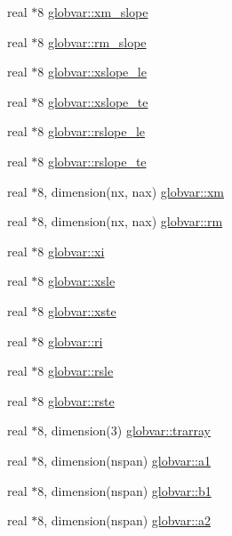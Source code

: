 \begin{DoxyCompactItemize}
\item 
real $\ast$8 \hyperlink{namespaceglobvar_acec26aa18c34a950efbf95fbe83fb5e3}{globvar\+::xm\+\_\+slope}
\item 
real $\ast$8 \hyperlink{namespaceglobvar_a7c5baea908b3455982aa5e0919c52887}{globvar\+::rm\+\_\+slope}
\item 
real $\ast$8 \hyperlink{namespaceglobvar_a6e2e677a1248884a0beaf14ef03a7d1e}{globvar\+::xslope\+\_\+le}
\item 
real $\ast$8 \hyperlink{namespaceglobvar_a1a3ff3ff118aab96696dca2da144a415}{globvar\+::xslope\+\_\+te}
\item 
real $\ast$8 \hyperlink{namespaceglobvar_a3f456fc3a0cf242d08ec86f9105644be}{globvar\+::rslope\+\_\+le}
\item 
real $\ast$8 \hyperlink{namespaceglobvar_a0669c0da9b37b2db9ee462980dc9df12}{globvar\+::rslope\+\_\+te}
\item 
real $\ast$8, dimension(nx, nax) \hyperlink{namespaceglobvar_aa5ba5cdfdecc13b0a215ac7e8bee5b9f}{globvar\+::xm}
\item 
real $\ast$8, dimension(nx, nax) \hyperlink{namespaceglobvar_abafcefbd5ca40029995e377b3763583a}{globvar\+::rm}
\item 
real $\ast$8 \hyperlink{namespaceglobvar_ab4afb7fee7167606b28de64b112f336c}{globvar\+::xi}
\item 
real $\ast$8 \hyperlink{namespaceglobvar_ab051d7b38899c922098ea01a71759a7b}{globvar\+::xsle}
\item 
real $\ast$8 \hyperlink{namespaceglobvar_a175236fc826dcd7229a2bc77e347288a}{globvar\+::xste}
\item 
real $\ast$8 \hyperlink{namespaceglobvar_a12aec4b3d6dfcab1523c9d90f90da9b9}{globvar\+::ri}
\item 
real $\ast$8 \hyperlink{namespaceglobvar_a672ec2d03f2dd0aabce80877d9183dd0}{globvar\+::rsle}
\item 
real $\ast$8 \hyperlink{namespaceglobvar_a7de91c05fa9558d6a5e2a2abf5a2b0eb}{globvar\+::rste}
\item 
real $\ast$8, dimension(3) \hyperlink{namespaceglobvar_a0256e20cf8e4b736584fce52a2be89ad}{globvar\+::trarray}
\item 
real $\ast$8, dimension(nspan) \hyperlink{namespaceglobvar_a3597b44b373a600eb4d077e55967c69d}{globvar\+::a1}
\item 
real $\ast$8, dimension(nspan) \hyperlink{namespaceglobvar_a957461f913a85866eb6d67bc8660bc5d}{globvar\+::b1}
\item 
real $\ast$8, dimension(nspan) \hyperlink{namespaceglobvar_a83f42557544a90cc620fc38150229baa}{globvar\+::a2}

\end{DoxyCompactItemize}

